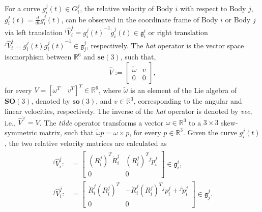 \documentclass[lettersize,journal]{IEEEtran}
\def \SE {\textbf{SE}(3)}
\def \SO {\textbf{SO}(3)}
\def \se {\textbf{se}(3)}
\def \so {\textbf{so}(3)}
\def \R  {\mathbb{R}}
\def \g  {\mathfrak{g}}
\theoremstyle{remark}
\begin{document}
For a curve $g_i^j(t)\in G_i^j$, the relative velocity of Body $i$ with respect to Body $j$, $\dot{g}^j_i(t)=\frac{d}{dt}g^j_i(t)$, can be observed in the coordinate frame of Body $i$ or Body $j$ via left translation $^i\hat{V}_i^j={g^j_i(t)}^{-1}\dot{g}^j_i(t)\in\mathfrak{g}_i^i$ or right translation $^j\hat{V}_i^j=\dot{g}^j_i(t){g^j_i(t)}^{-1}\in\mathfrak{g}_j^j$, respectively. 
The \textit{hat} operator is the vector space isomorphism between $\R^6$ and $\se$, such that,
\begin{equation}
    \hat{V}:=\begin{bmatrix}\tilde{\omega} & v\\0 & 0\end{bmatrix},
\end{equation}
for every $V=[\omega^T\quad v^T]^T\in \R^6$, where $\tilde{\omega}$ is an element of the Lie algebra of $\SO$, denoted by $\so$, and $v \in \R^3$, corresponding to the angular and linear velocities, respectively. The inverse of the \textit{hat} operator is denoted by \textit{vee}, i.e., $\hat{V}^\vee=V$. The \textit{tilde} operator transforms a vector $\omega\in\R^3$ to a $3 \times 3$ skew-symmetric matrix, such that $\tilde{\omega}p=\omega\times p$, for every $p\in\R^3$. Given the curve $g_i^j(t)$, the two relative velocity matrices are calculated as
\begin{align}
    \begin{split}
   ^i\hat{V}_i^j:&=\begin{bmatrix}({R}^j_i)^T\dot{R}^j_i & (R^j_i)^T{}^j\dot{p}^j_i\\0 & 0\end{bmatrix} \in \g^i_i,\\
    ^j\hat{V}_i^j:&=\begin{bmatrix}\dot{R}^j_i(R^j_i)^T & -\dot{R}^j_i(R^j_i)^T{}^j{p}^j_i+{}^j\dot{p}^j_i\\0 & 0\end{bmatrix} \in \g^j_j.
     \end{split}
     \label{relvel}
\end{align}
\end{document}
